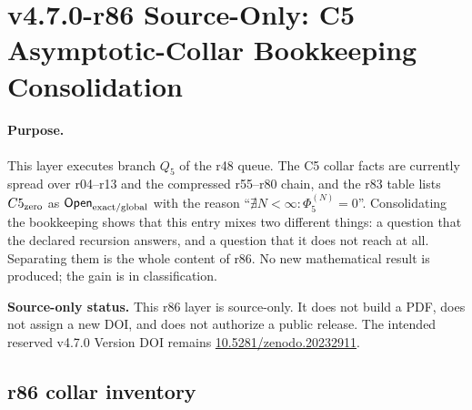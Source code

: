 \clearpage
\section*{v4.7.0-r86 Source-Only: C5 Asymptotic-Collar Bookkeeping Consolidation}
\label{sec:r86-c5-asymptotic-collar-bookkeeping}

\paragraph{Purpose.}
This layer executes branch \(Q_5\) of the r48 queue.  The C5 collar facts are currently
spread over r04--r13 and the compressed r55--r80 chain, and the r83 table lists
\(C5_{\rm zero}\) as \(\mathsf{Open}_{\rm exact/global}\) with the reason
``\(\nexists N<\infty:\Phi_5^{(N)}=0\)''.  Consolidating the bookkeeping shows that this
entry mixes two different things: a question that the declared recursion answers, and a
question that it does not reach at all.  Separating them is the whole content of r86.  No
new mathematical result is produced; the gain is in classification.

\noindent\textbf{Source-only status.}
This r86 layer is source-only.  It does not build a PDF, does not assign a new DOI, and does
not authorize a public release.  The intended reserved v4.7.0 Version DOI remains
\href{https://doi.org/10.5281/zenodo.20232911}{10.5281/zenodo.20232911}.

\subsection*{r86 collar inventory}
\label{subsec:r86-collar-inventory}

